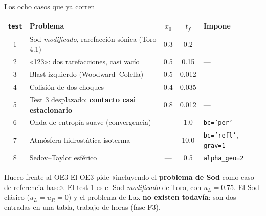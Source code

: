 \documentclass[aspectratio=169,10pt]{beamer}
\newcommand{\cod}[1]{\texttt{\small #1}}
\begin{document}
\begin{frame}[shrink]{Los ocho casos que ya corren}
  \centering
  \scriptsize
  \begin{tabular}{@{}clccl@{}}
    \toprule
    \cod{test} & \textbf{Problema} & $x_0$ & $t_f$ & \textbf{Impone} \\
    \midrule
    1 & Sod \emph{modificado}, rarefacción sónica (Toro 4.1) & 0.3 & 0.2 & --- \\
    2 & «123»: dos rarefacciones, casi vacío & 0.5 & 0.15 & --- \\
    3 & Blast izquierdo (Woodward--Colella) & 0.5 & 0.012 & --- \\
    4 & Colisión de dos choques & 0.4 & 0.035 & --- \\
    5 & Test 3 desplazado: \textbf{contacto casi estacionario} & 0.8 & 0.012 & --- \\
    6 & Onda de entropía suave (convergencia) & --- & 1.0 & \cod{bc='per'} \\
    7 & Atmósfera hidrostática isoterma & --- & 10.0 & \cod{bc='refl'}, \cod{grav=1} \\
    8 & Sedov--Taylor esférico & --- & 0.5 & \cod{alpha\_geo=2} \\
    \bottomrule
  \end{tabular}

  \vspace{0.7em}
  \begin{alertblock}{Hueco frente al OE3}
    \small
    El OE3 pide «incluyendo el \textbf{problema de Sod} como caso de referencia
    base». El test 1 es el Sod \emph{modificado} de Toro, con $u_L = 0.75$.
    El Sod clásico ($u_L=u_R=0$) y el problema de Lax \textbf{no existen todavía}:
    son dos entradas en una tabla, trabajo de horas (fase F3).
  \end{alertblock}
\end{frame}
\end{document}
